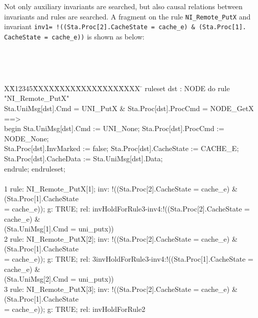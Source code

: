 \documentclass{llncs}
\newlength{\fminilength}
\newenvironment{fmini}[1][\linewidth]
  {\setlength{\fminilength}{#1\fboxsep-2\fboxrule}%
   \vspace{2ex}\noindent\begin{lrbox}{\fminibox}\begin{minipage}{\fminilength}%
   \mbox{ }\hfill\vspace{-2.5ex}}%
  {\end{minipage}\end{lrbox}\vspace{1ex}\hspace{0ex}%
   \framebox{\usebox{\fminibox}}}
\newenvironment{specification}
{\noindent\scriptsize
\tt\begin{fmini}\begin{tabbing}X\=X12345\=XXXX\=XXXX\=XXXX\=XXXX\=XXXX
\=\+\kill} {\end{tabbing}\normalfont\end{fmini}}
\begin{document}
Not only auxiliary invariants are searched, but also causal relations between   invariants and  rules are searched. A fragment on the rule {\tt NI\_Remote\_PutX} and invariant {\tt inv1= !((Sta.Proc[2].CacheState = cache\_e) \& (Sta.Proc[1].\ \\CacheState = cache\_e))} is shown as below:\\
\vspace{-0.3cm}

\begin{specification}
ruleset dst : NODE do rule "NI\_Remote\_PutX"\\
  Sta.UniMsg[dst].Cmd = UNI\_PutX \&  Sta.Proc[dst].ProcCmd = NODE\_GetX ==>\\
begin   Sta.UniMsg[dst].Cmd := UNI\_None;  Sta.Proc[dst].ProcCmd := NODE\_None;\\
  Sta.Proc[dst].InvMarked := false;   Sta.Proc[dst].CacheState := CACHE\_E;\\
  Sta.Proc[dst].CacheData := Sta.UniMsg[dst].Data;\\
endrule; endruleset;\\\\
1 rule: NI\_Remote\_PutX[1]; inv: !((Sta.Proc[2].CacheState = cache\_e) \& (Sta.Proc[1].CacheState\\ = cache\_e)); g: TRUE;
rel: invHoldForRule3-inv4:!((Sta.Proc[2].CacheState = cache\_e) \& \\(Sta.UniMsg[1].Cmd = uni\_putx))\\
2 rule: NI\_Remote\_PutX[2]; inv: !((Sta.Proc[2].CacheState = cache\_e) \& (Sta.Proc[1].CacheState\\ = cache\_e)); g: TRUE;
rel: 3invHoldForRule3-inv4:!((Sta.Proc[1].CacheState = cache\_e) \& \\(Sta.UniMsg[2].Cmd = uni\_putx))\\
3 rule: NI\_Remote\_PutX[3]; inv: !((Sta.Proc[2].CacheState = cache\_e) \& (Sta.Proc[1].CacheState\\ = cache\_e)); g: TRUE;
 rel: invHoldForRule2
\end{specification}
\end{document}
